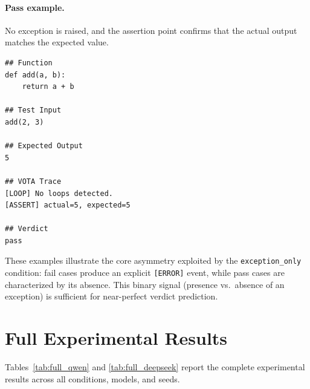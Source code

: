 \paragraph{Pass example.}
No exception is raised, and the assertion point confirms that the actual output matches the expected value.

\begin{scriptsize}
\begin{verbatim}
## Function
def add(a, b):
    return a + b

## Test Input
add(2, 3)

## Expected Output
5

## VOTA Trace
[LOOP] No loops detected.
[ASSERT] actual=5, expected=5

## Verdict
pass
\end{verbatim}
\end{scriptsize}

These examples illustrate the core asymmetry exploited by the \texttt{exception\_only} condition: fail cases produce an explicit \texttt{[ERROR]} event, while pass cases are characterized by its absence.
This binary signal (presence vs.\ absence of an exception) is sufficient for near-perfect verdict prediction.

\section{Full Experimental Results}
\label{sec:full_results}

Tables~\ref{tab:full_qwen} and \ref{tab:full_deepseek} report the complete experimental results across all conditions, models, and seeds.

\begin{table}[t]
\centering
\caption{Full results for Qwen-2.5-Coder-7B across all conditions and seeds. Conditions with a single seed report no variance. \texttt{exception\_only} achieves 99.83\% across all three seeds ($\sigma{=}$0). \texttt{ae\_only} achieves 99.64\% mean ($\pm$0.49; seed 123 at 99.08\% is the outlier).}
\label{tab:full_qwen}
\small
{}
\end{table}

